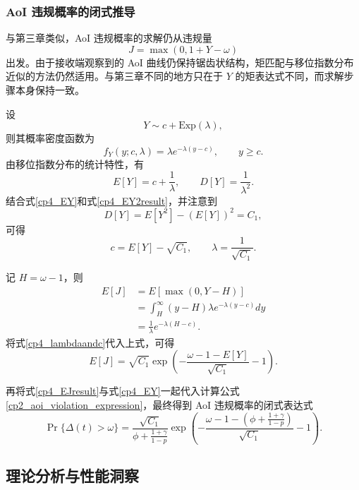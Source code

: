 \subsubsection{AoI 违规概率的闭式推导}

与第三章类似，AoI 违规概率的求解仍从违规量
\[
J=\max(0,1+Y-\omega)
\]
出发。由于接收端观察到的 AoI 曲线仍保持锯齿状结构，矩匹配与移位指数分布近似的方法仍然适用。与第三章不同的地方只在于 $Y$ 的矩表达式不同，而求解步骤本身保持一致。

设
\[
Y\sim c+\mathrm{Exp}(\lambda),
\]
则其概率密度函数为
\begin{equation}
    f_Y(y;c,\lambda)=\lambda e^{-\lambda(y-c)},\qquad y\ge c.
\end{equation}
由移位指数分布的统计特性，有
\begin{equation}
    E[Y] = c + \frac{1}{\lambda},\qquad D[Y] = \frac{1}{\lambda^2}.
\end{equation}
结合式\eqref{cp4_EY}和式\eqref{cp4_EY2result}，并注意到
\[
D[Y] = E[Y^2] - (E[Y])^2 = C_1,
\]
可得
\begin{equation}\label{cp4_lambdaandc}
    c = E[Y]-\sqrt{C_1},\qquad \lambda=\frac{1}{\sqrt{C_1}}.
\end{equation}

记 $H=\omega-1$，则
\begin{equation}
    \begin{aligned}
        E[J] &= E[\max(0,Y-H)] \\
             &= \int_H^\infty (y-H)\lambda e^{-\lambda(y-c)}dy \\
             &= \frac{1}{\lambda}e^{-\lambda(H-c)}.
    \end{aligned}
\end{equation}
将式\eqref{cp4_lambdaandc}代入上式，可得
\begin{equation}\label{cp4_EJresult}
    E[J] = \sqrt{C_1}\exp\left(-\frac{\omega-1-E[Y]}{\sqrt{C_1}}-1\right).
\end{equation}

再将式\eqref{cp4_EJresult}与式\eqref{cp4_EY}一起代入计算公式\eqref{cp2_aoi_violation_expression}，最终得到 AoI 违规概率的闭式表达式
\begin{equation}\label{cp4_violation_prob_simplified}
    \Pr\{\Delta(t)>\omega\}=
    \frac{\sqrt{C_1}}{\phi + \frac{1+\gamma}{1-p}}
    \exp\left(
    -\frac{\omega-1-\left(\phi + \frac{1+\gamma}{1-p}\right)}{\sqrt{C_1}}
    -1
    \right).
\end{equation}

\subsection{理论分析与性能洞察}

